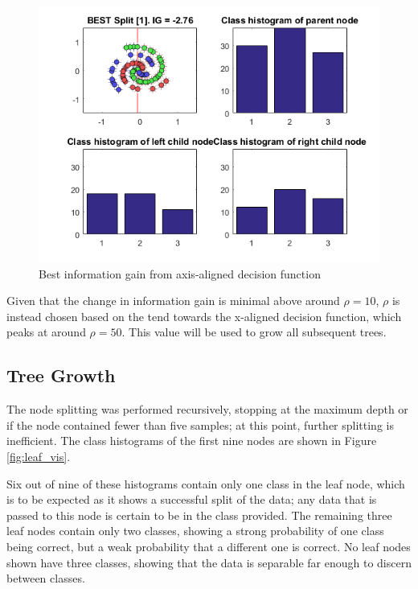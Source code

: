 \documentclass[a4paper, 10pt, conference]{ieeeconf}
\begin{document}
\begin{figure}[!ht]
  \centering
  \includegraphics[width=\linewidth]{img/best_axis}
  \caption{Best information gain from axis-aligned decision function}
  \label{fig:best_axis}
\end{figure}

Given that the change in information gain is minimal above around $\rho=10$, $\rho$ is instead chosen based on the tend towards the x-aligned decision function, which peaks at around $\rho=50$. This value will be used to grow all subsequent trees.

\subsection{Tree Growth}

The node splitting was performed recursively, stopping at the maximum depth or if the node contained fewer than five samples; at this point, further splitting is inefficient. The class histograms of the first nine nodes are shown in Figure \ref{fig:leaf_vis}. 

Six out of nine of these histograms contain only one class in the leaf node, which is to be expected as it shows a successful split of the data; any data that is passed to this node is certain to be in the class provided. The remaining three leaf nodes contain only two classes, showing a strong probability of one class being correct, but a weak probability that a different one is correct. No leaf nodes shown have three classes, showing that the data is separable far enough to discern between classes. 
\end{document}
